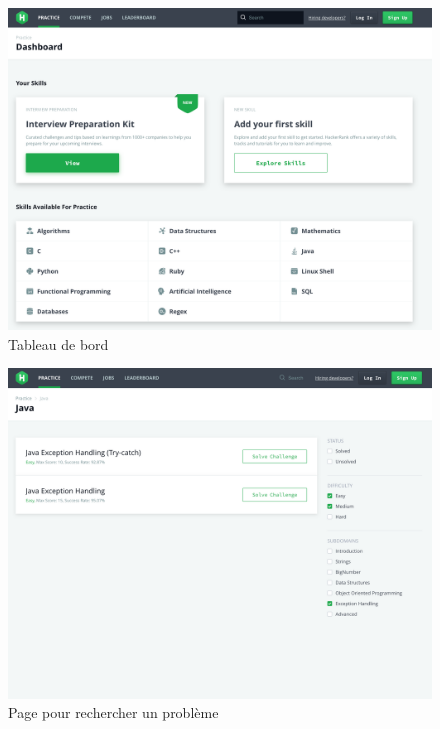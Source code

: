 \begin{figure}[H]
    \includegraphics[width=\textwidth,height=0.42\textheight,keepaspectratio]{images/comparison/hacker-1.png}
    \centering
    \caption[Hackerrank : tableau de bord]{Tableau de bord}
\end{figure}

\begin{figure}[H]
    \includegraphics[width=\textwidth,height=0.42\textheight,keepaspectratio]{images/comparison/hacker-2.png}
    \centering
    \caption[Hackerrank : page pour rechercher un problème]{Page pour rechercher un problème}
\end{figure}

